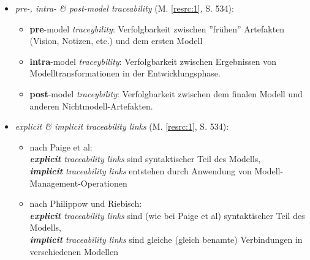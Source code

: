 \begin{itemize}
\item
\textit{pre-, intra- \& post-model traceability} (M. \ref{resrc:1}, S. 534):
\begin{itemize}
\item
\textbf{pre}-model \textit{traceybility}: 
Verfolgbarkeit zwischen ''frühen'' Artefakten (Vision, Notizen, etc.) und dem ersten Modell
\item
\textbf{intra}-model \textit{traceybility}:
Verfolgbarkeit zwischen Ergebnissen von Modelltransformationen in der Entwicklungsphase.
\item
\textbf{post}-model \textit{traceybility}:
Verfolgbarkeit zwischen dem finalen Modell und anderen Nichtmodell-Artefakten.
\end{itemize}

\item
\textit{explicit \& implicit traceability links} (M. \ref{resrc:1}, S. 534):
\begin{itemize}
\item nach Paige et al: 
\\\textit{\textbf{explicit} traceability links} sind syntaktischer Teil des Modells,
\\\textit{\textbf{implicit} traceability links} entstehen durch Anwendung von Modell-Management-Operationen
\item nach Philippow und Riebisch:
\\\textit{\textbf{explicit} traceability links} sind (wie bei Paige et al) syntaktischer Teil des Modells,
\\\textit{\textbf{implicit} traceability links} sind gleiche (gleich benamte) Verbindungen in verschiedenen Modellen
\end{itemize}


\end{itemize}




